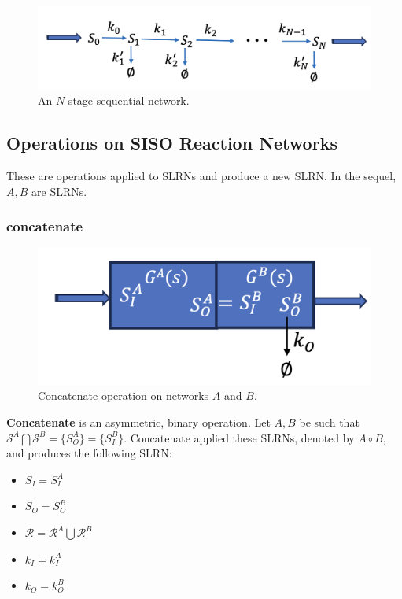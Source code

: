 \documentclass[unnumsec,webpdf,contemporary,large]{oup-authoring-template}%
\theoremstyle{thmstyleone}%
\theoremstyle{thmstyletwo}%
\theoremstyle{thmstylethree}%
\begin{document}
\begin{figure}
        \centering
         \includegraphics[scale=0.4]{figures/sequential_network.png}
          \caption[]{An $N$ stage sequential network.}
         \label{fig:sequential_network}
\end{figure}


\subsection{Operations on SISO Reaction Networks}
These are operations applied to SLRNs and produce a new SLRN.
In the sequel, $A, B$ are SLRNs.

\subsubsection{concatenate}
\begin{figure}
         \centering
         \includegraphics[scale=0.3]{figures/concatenate.png}
          \caption[]{Concatenate operation on networks $A$ and $B$.}
         \label{fig:concatenate}
\end{figure}

{\bf Concatenate} is an asymmetric, binary operation.
Let $A, B$ be such that $\mathcal{S}^A \bigcap \mathcal{S}^B =
\{ S^A_O \} = \{ S^B_I \}$. 
Concatenate applied these SLRNs, denoted by $A \circ  B$,
and produces
the following SLRN:
\begin{itemize}
\item $S_I =S^A_I$
\item $S_O = S^B_O$
\item $\mathcal{R} = \mathcal{R}^A \bigcup \mathcal{R}^B$
\item $k_I = k^A_I$
\item $k_O = k^B_O$
\end{itemize}
\end{document}
